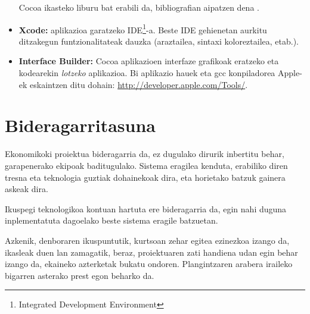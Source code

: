 \begin{itemize}
Cocoa ikasteko liburu bat erabili da, bibliografian aipatzen dena \cite{hi:08}.
\item \textbf{Xcode:} aplikazioa garatzeko IDE\footnote{Integrated Development Environment}-a. Beste IDE gehienetan aurkitu ditzakegun funtzionalitateak dauzka (araztailea, sintaxi koloreztailea, etab.).
\item \textbf{Interface Builder:} Cocoa aplikazioen interfaze grafikoak eratzeko eta kodearekin \textit{lotzeko} aplikazioa. Bi aplikazio hauek eta gcc konpiladorea Apple-ek eskaintzen ditu dohain: \url{http://developer.apple.com/Tools/}.
\end{itemize} 
\section{Bideragarritasuna}
Ekonomikoki proiektua bideragarria da, ez dugulako dirurik inbertitu behar, garapenerako ekipoak baditugulako. Sistema eragilea kenduta, erabiliko diren tresna eta teknologia guztiak dohainekoak dira, eta horietako batzuk gainera askeak dira.

Ikuspegi teknologikoa kontuan hartuta ere bideragarria da, egin nahi duguna inplementatuta dagoelako beste sistema eragile batzuetan.

Azkenik, denboraren ikuspuntutik, kurtsoan zehar egitea ezinezkoa izango da, ikasleak duen lan zamagatik, beraz, proiektuaren zati handiena udan egin behar izango da, ekaineko azterketak bukatu ondoren. Plangintzaren arabera iraileko bigarren asterako prest egon beharko da.
